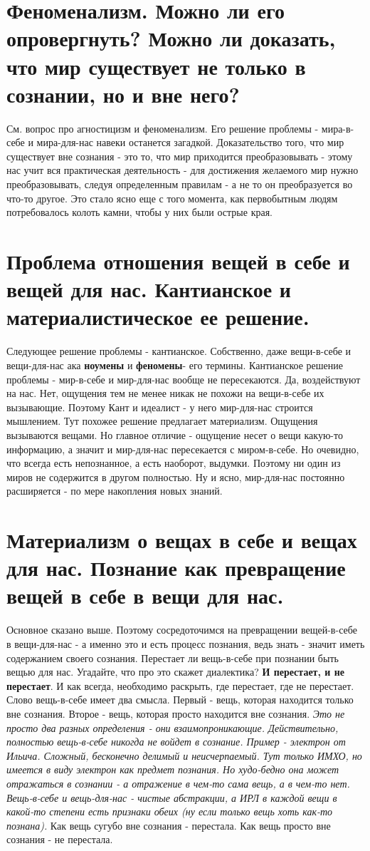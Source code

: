 \section{ Феноменализм. Можно ли его опровергнуть? Можно ли доказать, что мир существует не только в сознании, но и вне него?}
См. вопрос про агностицизм и феноменализм. Его решение проблемы - мира-в-себе и мира-для-нас навеки останется загадкой. Доказательство того, что мир существует вне сознания - это то, что мир приходится преобразовывать - этому нас учит вся практическая деятельность - для достижения желаемого мир нужно преобразовывать, следуя определенным правилам - а не то он преобразуется во что-то другое. Это стало ясно еще с того момента, как первобытным людям потребовалось колоть камни, чтобы у них были острые края. 

\section{ Проблема отношения вещей в себе и вещей для нас. Кантианское и материалистическое ее решение.}
Следующее решение проблемы - кантианское. Собственно, даже вещи-в-себе и вещи-для-нас ака \textbf{ноумены} и \textbf{феномены}- его термины. Кантианское решение проблемы - мир-в-себе и мир-для-нас вообще не пересекаются. Да, воздействуют на нас. Нет, ощущения тем не менее никак не похожи на вещи-в-себе их вызывающие. Поэтому Кант и идеалист - у него мир-для-нас строится мышлением. Тут похожее решение предлагает материализм. Ощущения вызываются вещами. Но главное отличие - ощущение несет о вещи какую-то информацию, а значит и мир-для-нас пересекается с миром-в-себе. Но очевидно, что всегда есть непознанное, а есть наоборот, выдумки. Поэтому ни один из миров не содержится в другом полностью. Ну и ясно, мир-для-нас постоянно расширяется - по мере накопления новых знаний.

\section{ Материализм о вещах в себе и вещах для нас. Познание как превращение вещей в себе в вещи для нас.}
Основное сказано выше. Поэтому сосредоточимся на превращении вещей-в-себе в вещи-для-нас - а именно это и есть процесс познания, ведь знать - значит иметь содержанием своего сознания. Перестает ли вещь-в-себе при познании быть вещью для нас. Угадайте, что про это скажет диалектика? \textbf{И перестает, и не перестает}. И как всегда, необходимо раскрыть, где перестает, где не перестает. Слово вещь-в-себе имеет два смысла. Первый - вещь, которая находится только вне сознания. Второе - вещь, которая просто находится вне сознания. \textit{Это не просто два разных определения - они взаимопроникающие. Действительно, полностью вещь-в-себе никогда не войдет в сознание. Пример - электрон от Ильича. Сложный, бесконечно делимый и неисчерпаемый. Тут только ИМХО, но имеется в виду электрон как предмет познания. Но худо-бедно она может отражаться в сознании - а отражение в чем-то сама вещь, а в чем-то нет. Вещь-в-себе и вещь-для-нас - чистые абстракции, а ИРЛ в каждой вещи в какой-то степени есть признаки обеих (ну если только вещь хоть как-то познана).} Как вещь сугубо вне сознания - перестала. Как вещь просто вне сознания - не перестала.

